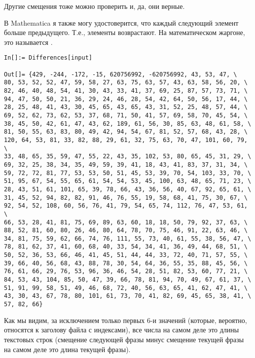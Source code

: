Другие смещения тоже можно проверить и, да, они верные.

В Mathematica я также могу удостоверится, что каждый следующий элемент больше предыдущего.
Т.е., элементы возврастают.
На математическом жаргоне, это называется .

\begin{lstlisting}[style=custommath]
In[]:= Differences[input]

Out[]= {429, -244, -172, -15, 620756992, -620756992, 43, 53, 47, \
80, 53, 52, 52, 47, 59, 58, 27, 63, 75, 63, 57, 43, 63, 58, 56, 20, \
82, 46, 40, 48, 54, 41, 30, 43, 33, 41, 37, 69, 25, 87, 57, 73, 71, \
94, 47, 50, 50, 21, 36, 29, 24, 46, 28, 54, 42, 64, 50, 56, 17, 44, \
28, 25, 48, 41, 43, 30, 45, 65, 43, 65, 43, 31, 52, 25, 48, 57, 44, \
69, 52, 62, 73, 62, 53, 37, 68, 71, 50, 41, 57, 69, 58, 70, 45, 54, \
38, 45, 50, 42, 61, 47, 43, 62, 189, 61, 56, 30, 85, 63, 48, 61, 58, \
81, 50, 55, 63, 83, 80, 49, 42, 94, 54, 67, 81, 52, 57, 68, 43, 28, \
120, 64, 53, 81, 33, 82, 88, 29, 61, 32, 75, 63, 70, 47, 101, 60, 79, \
33, 48, 65, 35, 59, 47, 55, 22, 43, 35, 102, 53, 80, 65, 45, 31, 29, \
69, 32, 25, 38, 34, 35, 49, 59, 39, 41, 18, 43, 41, 83, 37, 31, 34, \
59, 72, 72, 81, 77, 53, 53, 50, 51, 45, 53, 39, 70, 54, 103, 33, 70, \
51, 95, 67, 54, 55, 65, 61, 54, 54, 53, 45, 100, 63, 48, 65, 71, 23, \
28, 43, 51, 61, 101, 65, 39, 78, 66, 43, 36, 56, 40, 67, 92, 65, 61, \
31, 45, 52, 94, 82, 82, 91, 46, 76, 55, 19, 58, 68, 41, 75, 30, 67, \
92, 54, 52, 108, 60, 56, 76, 41, 79, 54, 65, 74, 112, 76, 47, 53, 61, \
66, 53, 28, 41, 81, 75, 69, 89, 63, 60, 18, 18, 50, 79, 92, 37, 63, \
88, 52, 81, 60, 80, 26, 46, 80, 64, 78, 70, 75, 46, 91, 22, 63, 46, \
34, 81, 75, 59, 62, 66, 74, 76, 111, 55, 73, 40, 61, 55, 38, 56, 47, \
78, 81, 62, 37, 41, 60, 68, 40, 33, 54, 34, 41, 36, 49, 44, 68, 51, \
50, 52, 36, 53, 66, 46, 41, 45, 51, 44, 44, 33, 72, 40, 71, 57, 55, \
39, 66, 40, 56, 68, 43, 88, 78, 30, 54, 64, 36, 55, 35, 88, 45, 56, \
76, 61, 66, 29, 76, 53, 96, 36, 46, 54, 28, 51, 82, 53, 60, 77, 21, \
84, 53, 43, 104, 85, 50, 47, 39, 66, 78, 81, 94, 70, 49, 67, 61, 37, \
51, 91, 99, 58, 51, 49, 46, 68, 72, 40, 56, 63, 65, 41, 62, 47, 41, \
43, 30, 43, 67, 78, 80, 101, 61, 73, 70, 41, 82, 69, 45, 65, 38, 41, \
57, 82, 66}
\end{lstlisting}

Как мы видим, за исключением только первых 6-и значений
(которые, вероятно, относятся к заголову файла с индексами),
все числа на самом деле это длины текстовых строк
(смещение следующей фразы минус смещение текущей фразы на самом деле это длина текущей фразы).

